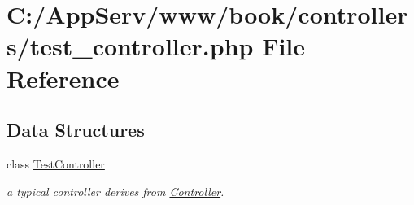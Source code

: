 \hypertarget{test__controller_8php}{
\section{C:/AppServ/www/book/controllers/test\_\-controller.php File Reference}
\label{test__controller_8php}
}
\subsection*{Data Structures}
\begin{DoxyCompactItemize}
\item 
class \hyperlink{class_test_controller}{TestController}
\begin{DoxyCompactList}\small\item\em a typical controller derives from \hyperlink{class_controller}{Controller}. \item\end{DoxyCompactList}\end{DoxyCompactItemize}
